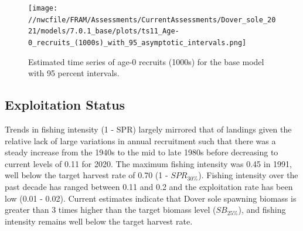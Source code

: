 \documentclass[11pt,
  english,
  a4paper,
]{article}
\begin{document}
\leavevmode\tagmcend\tagstructend\par




\begin{figure}
\centering
\texttt{[image: //nwcfile/FRAM/Assessments/CurrentAssessments/Dover\_sole\_2021/models/7.0.1\_base/plots/ts11\_Age-0\_recruits\_(1000s)\_with\_95\_asymptotic\_intervals.png]}
\caption{Estimated time series of age-0 recruits (1000s) for the base model with 95 percent intervals.\label{fig:es-recruits}}
\end{figure}

\tagmcend\tagstructend

\clearpage


\hypertarget{exploitation-status}{%
\subsection*{Exploitation Status}\label{exploitation-status}}

\leavevmode\tagmcend\tagstructend


Trends in fishing intensity (1 - SPR) largely mirrored that of landings given the relative lack of large variations in annual recruitment such that there was a steady increase from the 1940s to the mid to late 1980s before decreasing to current levels of 0.11 for 2020. The maximum fishing intensity was 0.45 in 1991, well below the target harvest rate of 0.70 (1 - {\(SPR_{30\%}\)\leavevmode\tagmcend\tagstructend}). Fishing intensity over the past decade has ranged between 0.11 and 0.2 and the exploitation rate has been low (0.01 - 0.02). Current estimates indicate that Dover sole spawning biomass is greater than 3 times higher than the target biomass level ({\(SB_{25\%}\)\leavevmode\tagmcend\tagstructend}), and fishing intensity remains well below the target harvest rate.

\leavevmode\tagmcend\tagstructend\par
\end{document}
